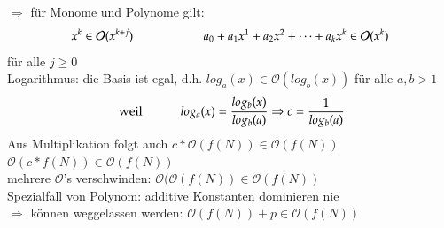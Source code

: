 \documentclass[11pt, fleqn]{scrreprt}
\begin{document}
$\Rightarrow$ für Monome und Polynome gilt:
\[ x^k \in \mathcal O(x^{k+j}) \hspace*{2cm} a_0 + a_1x^1 + a_2x^2 + \dots + a_kx^k \in \mathcal O(x^k)\]
für alle $j \geq 0$ \\
Logarithmus: die Basis ist egal, d.h. $log_a(x) \in \mathcal O(log_b(x))$ für alle $a,b >1$ 
\[ \text{ weil  }\hspace*{1cm} log_a(x) = \frac{log_b(x)}{log_b(a)} \Rightarrow c = \frac{1}{log_b(a)}\]
Aus Multiplikation folgt auch\hspace*{1cm} $c* \mathcal O(f(N)) \in \mathcal O(f(N))$ \\
\hspace*{6cm} $\mathcal O(c*f(N)) \in \mathcal O(f(N))$ \\

mehrere $\mathcal O$'s verschwinden: $ \mathcal O( \mathcal O(f(N)) \in \mathcal O (f(N))$ \\

Spezialfall von Polynom: additive Konstanten dominieren nie \\
\hspace*{1cm}$\Rightarrow$ können weggelassen werden: $\mathcal O(f(N)) + p \in \mathcal O(f(N))$
\end{document}
